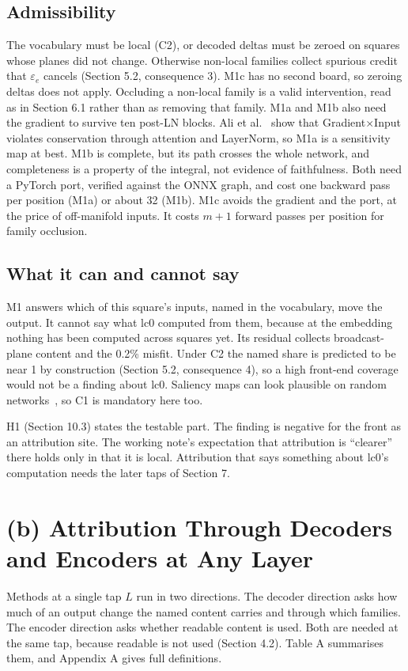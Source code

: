 \documentclass[conference]{IEEEtran}
\begin{document}
\subsection{Admissibility}\label{sec:6.2}
The vocabulary must be local (C2), or decoded deltas must be zeroed on squares whose planes did not change. Otherwise non-local families collect spurious credit that $\varepsilon_e$ cancels (Section 5.2, consequence 3). M1c has no second board, so zeroing deltas does not apply. Occluding a non-local family is a valid intervention, read as in Section 6.1 rather than as removing that family. M1a and M1b also need the gradient to survive ten post-LN blocks. Ali et al.~\cite{ali2022} show that Gradient$\times$Input violates conservation through attention and LayerNorm, so M1a is a sensitivity map at best. M1b is complete, but its path crosses the whole network, and completeness is a property of the integral, not evidence of faithfulness. Both need a PyTorch port, verified against the ONNX graph, and cost one backward pass per position (M1a) or about 32 (M1b). M1c avoids the gradient and the port, at the price of off-manifold inputs. It costs $m+1$ forward passes per position for family occlusion.

\subsection{What it can and cannot say}\label{sec:6.3}
M1 answers which of this square's inputs, named in the vocabulary, move the output. It cannot say what lc0 computed from them, because at the embedding nothing has been computed across squares yet. Its residual collects broadcast-plane content and the 0.2\% misfit. Under C2 the named share is predicted to be near 1 by construction (Section 5.2, consequence 4), so a high front-end coverage would not be a finding about lc0. Saliency maps can look plausible on random networks~\cite{adebayo2018}, so C1 is mandatory here too.

H1 (Section 10.3) states the testable part. The finding is negative for the front as an attribution site. The working note's expectation that attribution is ``clearer'' there holds only in that it is local. Attribution that says something about lc0's computation needs the later taps of Section 7.

\section{(b) Attribution Through Decoders and Encoders at Any Layer}\label{sec:7}
Methods at a single tap $L$ run in two directions. The decoder direction asks how much of an output change the named content carries and through which families. The encoder direction asks whether readable content is used. Both are needed at the same tap, because readable is not used (Section 4.2). Table A summarises them, and Appendix A gives full definitions.
\end{document}
